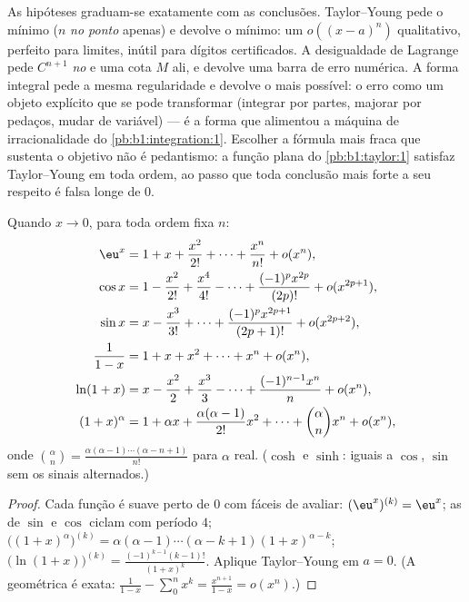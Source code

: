 \begin{remark}
As hipóteses graduam-se exatamente com as conclusões.
Taylor--Young pede o mínimo ($n$  \emph{no ponto} apenas) e
devolve o mínimo: um $o((x-a)^n)$ qualitativo, perfeito para limites, inútil
para dígitos certificados. A desigualdade de Lagrange pede $C^{n+1}$
\emph{no } e uma cota $M$ ali, e devolve uma barra de erro
numérica. A forma integral pede a mesma regularidade e devolve o mais
possível: o erro como um objeto explícito que se pode transformar
(integrar por partes, majorar por pedaços, mudar de variável) --- é a
forma que alimentou a máquina de irracionalidade do \cref{pb:b1:integration:1}. Escolher a
fórmula mais fraca que sustenta o objetivo não é pedantismo: a função
plana do \cref{pb:b1:taylor:1} satisfaz Taylor--Young em toda ordem, ao passo que
toda conclusão mais forte a seu respeito é falsa longe de $0$.
\end{remark}

\begin{proposition}
Quando $x \to 0$, para toda ordem fixa $n$:
\begin{align*}
\eu^x &= 1 + x + \frac{x^2}{2!} + \dots + \frac{x^n}{n!} + o(x^n),\\
\cos x &= 1 - \frac{x^2}{2!} + \frac{x^4}{4!} - \dots
+ \frac{(-1)^p x^{2p}}{(2p)!} + o(x^{2p+1}),\\
\sin x &= x - \frac{x^3}{3!} + \dots + \frac{(-1)^p
x^{2p+1}}{(2p+1)!} + o(x^{2p+2}),\\
\frac{1}{1 - x} &= 1 + x + x^2 + \dots + x^n + o(x^n),\\
\ln(1 + x) &= x - \frac{x^2}{2} + \frac{x^3}{3} - \dots +
\frac{(-1)^{n-1} x^n}{n} + o(x^n),\\
(1 + x)^\alpha &= 1 + \alpha x + \frac{\alpha(\alpha-1)}{2!}x^2 +
\dots + \binom{\alpha}{n} x^n + o(x^n),
\end{align*}
onde $\binom{\alpha}{n} = \frac{\alpha(\alpha - 1)\cdots(\alpha - n
+ 1)}{n!}$ para $\alpha$ real. ($\cosh$ e $\sinh$: iguais a $\cos$,
$\sin$ sem os sinais alternados.)
\label{prop:b1:taylor:standard}
\end{proposition}

\begin{proof}
Cada função é suave perto de $0$ com  fáceis de avaliar:
$(\eu^x)^{(k)} = \eu^x$; as  de $\sin$ e $\cos$ ciclam
com período $4$; $\bigl((1+x)^\alpha\bigr)^{(k)} = \alpha(\alpha -
1)\cdots(\alpha - k + 1)(1+x)^{\alpha - k}$;
$\bigl(\ln(1+x)\bigr)^{(k)} = \frac{(-1)^{k-1}(k-1)!}{(1+x)^k}$.
Aplique Taylor--Young em $a = 0$. (A geométrica é exata:
$\frac{1}{1-x} - \sum_0^n x^k = \frac{x^{n+1}}{1 - x} = o(x^n)$.)
\end{proof}

